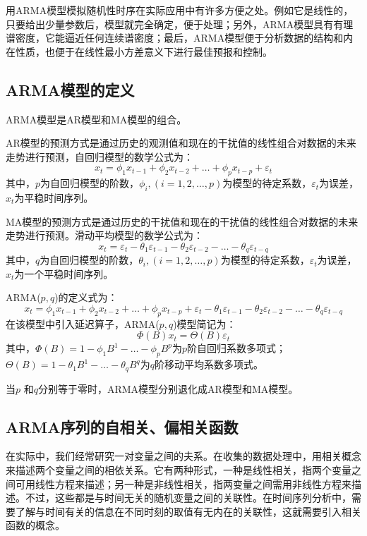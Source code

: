用ARMA模型模拟随机性时序在实际应用中有许多方便之处。例如它是线性的，只要给出少量参数后，模型就完全确定，便于处理；另外，ARMA模型具有有理谱密度，它能逼近任何连续谱密度；最后，ARMA模型便于分析数据的结构和内在性质，也便于在线性最小方差意义下进行最佳预报和控制。

\subsection{ARMA模型的定义}
ARMA模型是AR模型和MA模型的组合。

AR模型的预测方式是通过历史的观测值和现在的干扰值的线性组合对数据的未来走势进行预测，自回归模型的数学公式为：
\begin{equation}
\label{equ:xtAR}
	x_t = \phi_{1}x_{t-1} + \phi_{2}x_{t-2} + \dots +\phi_{p}x_{t-p} +\varepsilon_t
\end{equation}
其中，$p$为自回归模型的阶数，$\phi_{i},(i=1,2,\dots,p)$为模型的待定系数，$\varepsilon_t$为误差，$x_t$为平稳时间序列。

MA模型的预测方式是通过历史的干扰值和现在的干扰值的线性组合对数据的未来走势进行预测。滑动平均模型的数学公式为：
\begin{equation}
	x_t = \varepsilon_t - \theta_{1}\varepsilon_{t-1} - \theta_{2}\varepsilon_{t-2} - \dots - \theta_{q}\varepsilon_{t-q} 
\end{equation}
其中，$q$为自回归模型的阶数，$\theta_{i},(i=1,2,\dots,p)$为模型的待定系数，$\varepsilon_t$为误差，$x_t$为一个平稳时间序列。

ARMA($p,q$)的定义式为：
\begin{equation}
	 x_t = \phi_{1}x_{t-1} + \phi_{2}x_{t-2} + \dots +\phi_{p}x_{t-p} +\varepsilon_t - \theta_{1}\varepsilon_{t-1} - \theta_{2}\varepsilon_{t-2} - \dots - \theta_{q}\varepsilon_{t-q} 
\end{equation}
在该模型中引入延迟算子，ARMA($p,q$)模型简记为：
\begin{equation}
	\Phi(B)x_t = \Theta(B)\varepsilon_t
\end{equation}
其中，$ \Phi(B) = 1 - \phi_{1}B^1 - \dots - \phi_{p}B^p$为$p$阶自回归系数多项式；$ \Theta(B) = 1 - \theta_{1}B^1 - \dots - \theta_{q}B^q$为$q$阶移动平均系数多项式。

当$p$ 和$q$分别等于零时，ARMA模型分别退化成AR模型和MA模型。

\subsection{ARMA序列的自相关、偏相关函数}
在实际中，我们经常研究一对变量之间的夫系。在收集的数据处理中，用相关概念来描述两个变量之间的相依关系。它有两种形式，一种是线性相关，指两个变量之间可用线性方程来描述；另一种是非线性相关，指两变量之间需用非线性方程来描述。不过，这些都是与时间无关的随机变量之间的关联性。在时间序列分析中，需要了解与时间有关的信息在不同时刻的取值有无内在的关联性，这就需要引入相关函数的概念。

